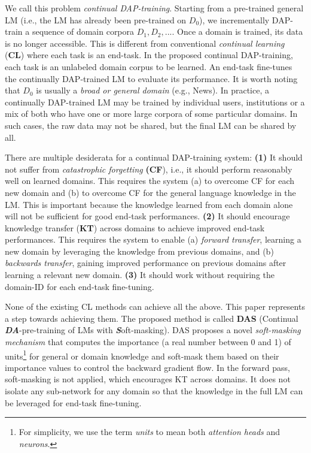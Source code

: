\documentclass{article} \usepackage{iclr2023_conference,times}
\begin{document}
{\color{black} We call this problem \textit{continual DAP-training}. 
Starting from a pre-trained general LM (i.e., the LM has already been pre-trained on $D_0$), we incrementally DAP-train a sequence of domain corpora $D_1, D_2, ...$. Once a domain is trained, its data is no longer accessible. This is different from conventional \textit{continual learning} (\textbf{CL}) where each task is an end-task. In the proposed continual DAP-training, each task is an unlabeled domain corpus to be learned. An end-task fine-tunes {\color{black}the continually DAP-trained LM to evaluate its performance}. It is worth noting that $D_0$ is usually a \textit{broad or general domain} (e.g., News). In practice, a continually DAP-trained LM may be trained by individual users, institutions or a mix of both who have one or more large corpora of some particular domains. In such cases, the raw data may not be shared, but the final LM can be shared by all. 

}





There are multiple desiderata for a continual DAP-training system: 
\textbf{(1)} It should not suffer from \textit{catastrophic forgetting} \textbf{(CF}),
i.e., it should perform reasonably well on learned domains. This requires the system (a) to overcome CF for each new domain and (b) to overcome CF for the general language knowledge in the LM. This is important because 
the knowledge learned from each domain alone will not be sufficient for good end-task performances. 
\textbf{(2)} It should encourage knowledge transfer (\textbf{KT}) across domains to achieve improved end-task performances.
This requires the system to enable (a) \textit{forward transfer}, learning a new domain by leveraging the knowledge from previous domains, and (b) \textit{backwards transfer}, gaining improved performance on previous domains after learning a relevant new domain.
\textbf{(3)} It should work without requiring the domain-ID for each end-task fine-tuning.



None of the existing CL methods can achieve all the above. This paper represents a step towards achieving them. The proposed method is called \textbf{DAS} (Continual \textit{\textbf{DA}}-pre-training of LMs with \textit{\textbf{S}}oft-masking).
DAS proposes a novel \textit{soft-masking mechanism} that computes the importance (a real number between 0 and 1) of units\footnote{For simplicity, we use the term \textit{units} to mean both \textit{attention heads} and \textit{neurons}.} for general or domain knowledge and soft-mask them based on their importance values to control the backward gradient flow. In the forward pass, soft-masking is not applied, which encourages KT across domains. It does not isolate any sub-network for any domain so that the knowledge in the full LM can be leveraged for end-task fine-tuning. 
\end{document}
